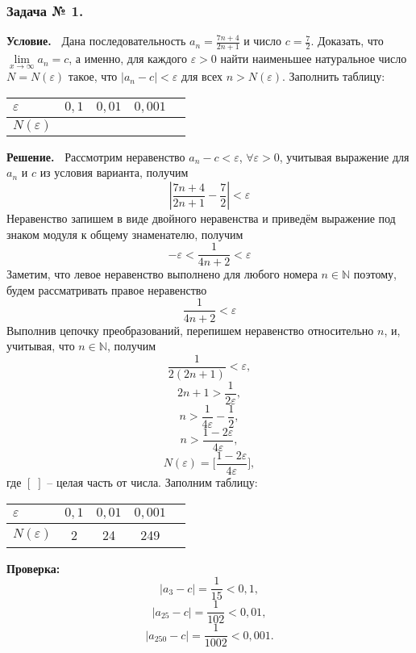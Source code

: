 \documentclass[12pt]{article}
\begin{document}
\subsubsection*{\center Задача № 1.}
{\bf Условие.~}
Дана последовательность $a_{n}=\frac{7n+4}{2n+1}$ и число $c=\frac{7}{2}$. Доказать, что $\lim\limits_{x\rightarrow\infty} a_{n}=c $, а именно, для каждого $\varepsilon>0$ найти наименьшее натуральное число  $N{=}N(\varepsilon)$ такое, что $|a_{n}-c|<\varepsilon$ для всех $n>N(\varepsilon)$. Заполнить таблицу: 
\begin{center}
\begin{tabular}{ | p{25pt} | c | c | c | c |}
\hline
$\varepsilon$& $0{,}1$ & $0{,}01$ & $0{,}001$ \\ \hline
$N(\varepsilon)$ &   &   &\\
\hline
\end{tabular}
\end{center}
\medskip
{\bf Решение.~}
Рассмотрим неравенство $a_{n}-c<\varepsilon$, $\forall\varepsilon>0$, учитывая выражение для $a_{n}$ и $c$ из условия варианта, получим 
$$\left|\frac{7n+4}{2n+1}-\frac{7}{2}\right|<\varepsilon$$
Неравенство запишем в виде двойного неравенства и приведём выражение под знаком модуля к общему знаменателю, получим
$${-}\varepsilon <\frac{1}{4n+2}<\varepsilon$$
Заметим, что левое неравенство выполнено для любого номера $n\in \mathbb{N}$ поэтому, будем рассматривать правое неравенство
$$\frac{1}{4n+2}<\varepsilon$$
Выполнив цепочку преобразований, перепишем неравенство относительно $n$, и, учитывая, что $n\in \mathbb{N}$, получим 
$$\frac{1}{2(2n+1)}<\varepsilon,$$
$$2n+1>\frac{1}{2\varepsilon},$$
$$n>\frac{1}{4\varepsilon}-\frac{1}{2},$$
$$n>\frac{1-2\varepsilon}{4\varepsilon},$$
$$N(\varepsilon)=\biggl[\frac{1-2\varepsilon}{4\varepsilon}\biggr],$$
где $[\;]$ -- целая часть от числа. Заполним таблицу:
\begin{center}
\begin{tabular}{ | p{25pt} | c | c | c | c |}
\hline
$\varepsilon$& $0{,}1$ & $0{,}01$ & $0{,}001$ \\ \hline
$N(\varepsilon)$ & 2  & 24 & 249\\
\hline
\end{tabular}
\end{center}
{\bf Проверка:~}
$$|a_{3}-c|=\frac{1}{15}<0{,}1,$$
$$|a_{25}-c|=\frac{1}{102}<0{,}01,$$
$$|a_{250}-c|=\frac{1}{1002}<0{,}001.$$
\newpage
\end{document}
